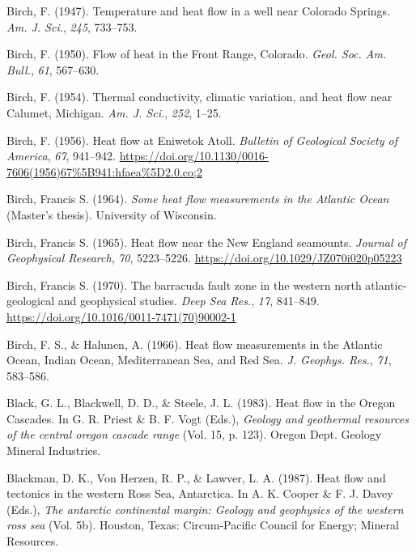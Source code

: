\documentclass[draft,linenumbers]{agujournal2018}
\begin{document}
\leavevmode{}%
Birch, F. (1947). Temperature and heat flow in a well near {Colorado
Springs}. \emph{Am. J. Sci.}, \emph{245}, 733--753.

\leavevmode{}%
Birch, F. (1950). Flow of heat in the {Front Range, Colorado}.
\emph{Geol. Soc. Am. Bull.}, \emph{61}, 567--630.

\leavevmode{}%
Birch, F. (1954). Thermal conductivity, climatic variation, and heat
flow near {Calumet, Michigan}. \emph{Am. J. Sci.}, \emph{252}, 1--25.

\leavevmode{}%
Birch, F. (1956). Heat flow at {Eniwetok Atoll}. \emph{Bulletin of
Geological Society of America}, \emph{67}, 941--942.
\url{https://doi.org/10.1130/0016-7606(1956)67\%5B941:hfaea\%5D2.0.co;2}

\leavevmode{}%
Birch, Francis S. (1964). \emph{Some heat flow measurements in the
{Atlantic Ocean}} (Master's thesis). University of Wisconsin.

\leavevmode{}%
Birch, Francis S. (1965). Heat flow near the {New England} seamounts.
\emph{Journal of Geophysical Research}, \emph{70}, 5223--5226.
\url{https://doi.org/10.1029/JZ070i020p05223}

\leavevmode{}%
Birch, Francis S. (1970). The barracuda fault zone in the western north
atlantic- geological and geophysical studies. \emph{Deep Sea Res.},
\emph{17}, 841--849. \url{https://doi.org/10.1016/0011-7471(70)90002-1}

\leavevmode{}%
Birch, F. S., \& Halunen, A. (1966). Heat flow measurements in the
{Atlantic Ocean, Indian Ocean, Mediterranean Sea, and Red Sea}. \emph{J.
Geophys. Res.}, \emph{71}, 583--586.

\leavevmode{}%
Black, G. L., Blackwell, D. D., \& Steele, J. L. (1983). Heat flow in
the {Oregon Cascades}. In G. R. Priest \& B. F. Vogt (Eds.),
\emph{Geology and geothermal resources of the central oregon cascade
range} (Vol. 15, p. 123). Oregon Dept. Geology Mineral Industries.

\leavevmode{}%
Blackman, D. K., Von Herzen, R. P., \& Lawver, L. A. (1987). Heat flow
and tectonics in the western {Ross Sea}, {Antarctica}. In A. K. Cooper
\& F. J. Davey (Eds.), \emph{The antarctic continental margin: Geology
and geophysics of the western ross sea} (Vol. 5b). Houston, Texas:
Circum-Pacific Council for Energy; Mineral Resources.
\end{document}
